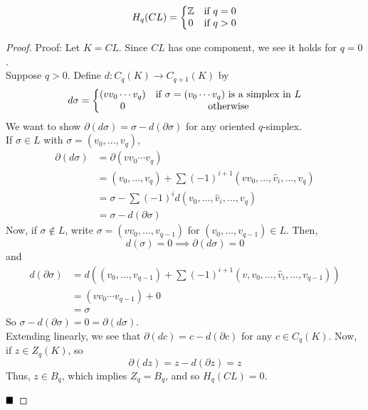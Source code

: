 \begin{theorem}
    \[ H_q(CL) = \left\{\begin{matrix} \Z & \tt{if } q = 0 \\ 0 & \tt{if } q > 0 \end{matrix}\right. \]
\end{theorem}
\begin{proof}{Proof:}
    Let $K = CL$. Since $CL$ has one component, we see it holds for $q = 0$.\\

    Suppose $q > 0$. Define $d : C_q(K) \to C_{q + 1}(K)$ by
    \[ d\sigma = \left\{\begin{matrix} (vv_0 \cdots v_q) & \tt{if } \sigma = (v_0 \cdots v_q) \tt{ is a simplex in } L \\ 0 & \tt{otherwise} \end{matrix}\right. \]
    We want to show $\partial(d\sigma) = \sigma - d(\partial\sigma)$ for any oriented $q$-simplex.\\

    If $\sigma \in L$ with $\sigma = (v_0, \ldots, v_q)$,
    \begin{align*}
        \partial(d\sigma) &= \partial(vv_0 \cdots v_q)\\
        &= (v_0, \ldots, v_q) + \sum (-1)^{i + 1}(vv_0, \ldots, \widehat{v}_i, \ldots, v_q)\\
        &= \sigma - \sum (-1)^{i}d(v_0, \ldots, \widehat{v}_i, \ldots, v_q)\\
        &= \sigma - d(\partial\sigma)
    \end{align*}
    Now, if $\sigma \notin L$, write $\sigma = (vv_0, \ldots, v_{q - 1})$ for $(v_0, \ldots, v_{q - 1}) \in L$. Then,
    \[ d(\sigma) = 0 \implies \partial(d\sigma) = 0 \]
    and
    \begin{align*}
        d(\partial\sigma) &= d\left((v_0, \ldots, v_{q - 1}) + \sum (-1)^{i + 1}(v, v_0, \ldots, \widehat{v}_i, \ldots, v_{q - 1})\right)\\
        &= (vv_0 \cdots v_{q - 1}) + 0\\
        &= \sigma
    \end{align*}
    So $\sigma - d(\partial\sigma) = 0 = \partial(d\sigma)$.\\

    Extending linearly, we see that $\partial(dc) = c - d(\partial c)$ for any $c \in C_q(K)$. Now, if $z \in Z_q(K)$, so
    \[ \partial(dz) = z - d(\partial z) = z \]
    Thus, $z \in B_q$, which implies $Z_q = B_q$, and so $H_q(CL) = 0$.

    $\qed$
\end{proof}

